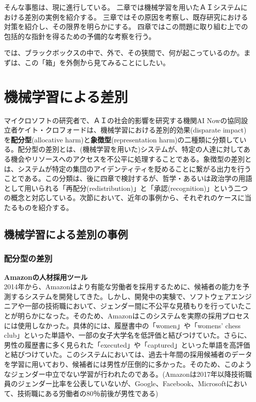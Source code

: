 \documentclass[b5j,twoside,twocolumn]{utarticle}
\begin{document}
そんな事態は、現に進行している。
二章では機械学習を用いたＡＩシステムにおける差別の実例を紹介する。
三章ではその原因を考察し、既存研究における対策を紹介し、その限界を明らかにする。
四章ではこの問題に取り組む上での包括的な指針を得るための予備的な考察を行う。


では、ブラックボックスの中で、外で、その狭間で、何が起こっているのか。まずは、この「箱」を\.外\.側から見てみることにしたい。



\section{機械学習による差別}
マイクロソフトの研究者で、ＡＩの社会的影響を研究する機関AI Nowの協同設立者ケイト・クロフォードは、機械学習における差別的効果(disparate impact)を\textbf{配分型}(allocative  harm)と\textbf{象徴型}(representation harm)の二種類に分類している\cite{kate}。配分型の差別とは、(機械学習を用いた)システムが、特定の人達に対してある機会やリソースへのアクセスを不公平に処理することである。象徴型の差別とは、システムが特定の集団のアイデンティティを貶めることに繋がる出力を行うことである。この分類は、後に四章で検討するが、哲学・あるいは政治学の用語として用いられる「再配分(redistribution)」と「承認(recognition)」という二つの概念と対応している。次節において、近年の事例から、それぞれのケースに当たるものを紹介する。



\subsection{機械学習による差別の事例}
\subsubsection*{配分型の差別}
\textbf{Amazonの人材採用ツール}\\
2014年から、Amazonはより有能な労働者を採用するために、候補者の能力を予測するシステムを開発してきた。しかし、開発中の実験で、ソフトウェアエンジニアや一部の技術職において、ジェンダー間に不公平な見積もりを行っていたことが明らかになった。そのため、Amazonはこのシステムを実際の採用プロセスには使用しなかった。具体的には、履歴書中の「women」や「womens' chess club」といった単語や、一部の女子大学名を低評価と結びつけていた。さらに、男性の履歴書に多く見られた「executed」や「captured」といった単語を高評価と結びつけていた。このシステムにおいては、過去十年間の採用候補者のデータを学習に用いており、候補者には男性が圧倒的に多かった。そのため、このようなジェンダー中立でない学習が行われたのである。(Amazonは2017年以降技術職員のジェンダー比率を公表していないが、Google、Facebook、Microsoftにおいて、技術職にある労働者の80％前後が男性である)
\end{document}
